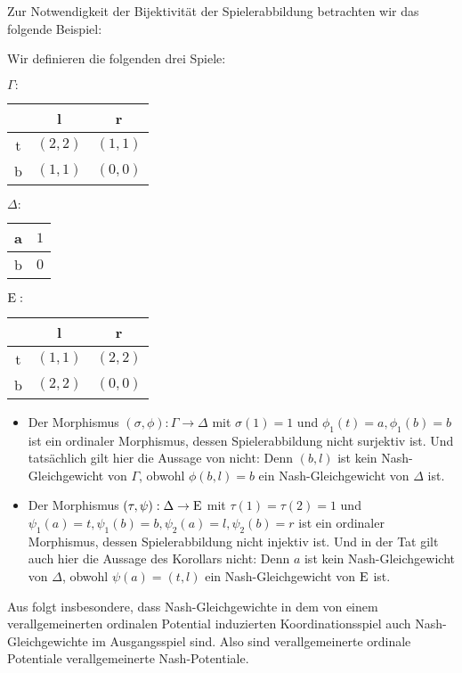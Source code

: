 Zur Notwendigkeit der Bijektivität der Spielerabbildung betrachten wir das folgende Beispiel:

\begin{bsp}
	Wir definieren die folgenden drei Spiele:
	\begin{center}
		$\Gamma:$ \quad
		\begin{tabular}{c||c|c}
				& l 		& r 		\\\hline\hline
			t	& $(2,2)$	& $(1,1)$	\\\hline
			b	& $(1,1)$	& $(0,0)$ 
		\end{tabular}\hspace{3em}
		$\Delta:$ \quad
		\begin{tabular}{c||c}
			a 		& $1$ 		\\\hline
			b		& $0$		
		\end{tabular}\hspace{3em}
		$\mathrm{E}:$ \quad
		\begin{tabular}{c||c|c}
				& l 		& r 		\\\hline\hline
			t	& $(1,1)$	& $(2,2)$	\\\hline
			b	& $(2,2)$	& $(0,0)$ 
		\end{tabular}
	\end{center}	

	\begin{itemize}
		\item Der Morphismus $(\sigma, \phi): \Gamma \to \Delta$ mit $\sigma(1) = 1$ und $\phi_1(t) = a, \phi_1(b) = b$ ist ein ordinaler Morphismus, dessen Spielerabbildung nicht surjektiv ist. Und tatsächlich gilt hier die Aussage von  nicht: Denn $(b,l)$ ist kein Nash-Gleichgewicht von $\Gamma$, obwohl $\phi(b,l) = b$ ein Nash-Gleichgewicht von $\Delta$ ist.
		\item Der Morphismus $(\tau, \psi): \Delta \to \mathrm{E}$ mit $\tau(1) = \tau(2) = 1$ und $\psi_1(a) = t, \psi_1(b) = b, \psi_2(a) = l, \psi_2(b) = r$ ist ein ordinaler Morphismus, dessen Spielerabbildung nicht injektiv ist. Und in der Tat gilt auch hier die Aussage des Korollars nicht: Denn $a$ ist kein Nash-Gleichgewicht von $\Delta$, obwohl $\psi(a) = (t,l)$ ein Nash-Gleichgewicht von $\mathrm{E}$ ist.
	\end{itemize}
\end{bsp}

Aus  folgt insbesondere, dass Nash-Gleichgewichte in dem von einem verallgemeinerten ordinalen Potential induzierten Koordinationsspiel auch Nash-Gleichgewichte im Ausgangsspiel sind. Also sind verallgemeinerte ordinale Potentiale verallgemeinerte Nash-Potentiale.

